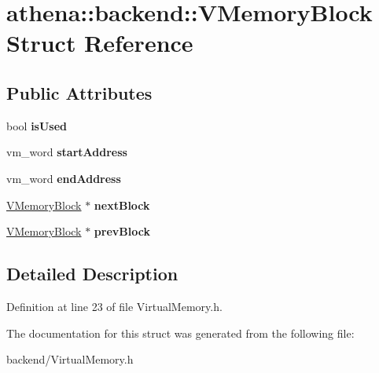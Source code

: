 \hypertarget{structathena_1_1backend_1_1_v_memory_block}{}\section{athena\+:\+:backend\+:\+:V\+Memory\+Block Struct Reference}
\label{structathena_1_1backend_1_1_v_memory_block}
\subsection*{Public Attributes}
\begin{DoxyCompactItemize}
\item 
\mbox{\label{structathena_1_1backend_1_1_v_memory_block_a54350a136efca373277b4d91a09c15cf}} 
bool {\bfseries is\+Used}
\item 
\mbox{\label{structathena_1_1backend_1_1_v_memory_block_ae7999c6fd515f8150185b23a52e410a8}} 
vm\+\_\+word {\bfseries start\+Address}
\item 
\mbox{\label{structathena_1_1backend_1_1_v_memory_block_a2585be4f90d28d5d0838934f3569ea00}} 
vm\+\_\+word {\bfseries end\+Address}
\item 
\mbox{\label{structathena_1_1backend_1_1_v_memory_block_a2bf211c6220136d1f9d38c86043ae2c6}} 
\mbox{\hyperlink{structathena_1_1backend_1_1_v_memory_block}{V\+Memory\+Block}} $\ast$ {\bfseries next\+Block}
\item 
\mbox{\label{structathena_1_1backend_1_1_v_memory_block_a9827bc62cfcb085a80d236311b7e1e2c}} 
\mbox{\hyperlink{structathena_1_1backend_1_1_v_memory_block}{V\+Memory\+Block}} $\ast$ {\bfseries prev\+Block}
\end{DoxyCompactItemize}


\subsection{Detailed Description}


Definition at line 23 of file Virtual\+Memory.\+h.



The documentation for this struct was generated from the following file\+:\begin{DoxyCompactItemize}
\item 
backend/Virtual\+Memory.\+h\end{DoxyCompactItemize}
